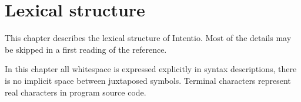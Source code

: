 \chapter{Lexical structure}

This chapter describes the lexical structure of Intentio. Most of the details may be skipped in a first reading of the reference.

In this chapter all whitespace is expressed explicitly in syntax descriptions, there is no implicit space between juxtaposed symbols. Terminal characters represent real characters in program source code.
